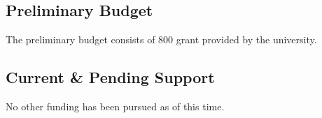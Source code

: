 \subsection{Preliminary Budget}
The preliminary budget consists of  800 grant provided by the university.

\subsection{Current \& Pending Support}
No other funding has been pursued as of this time.